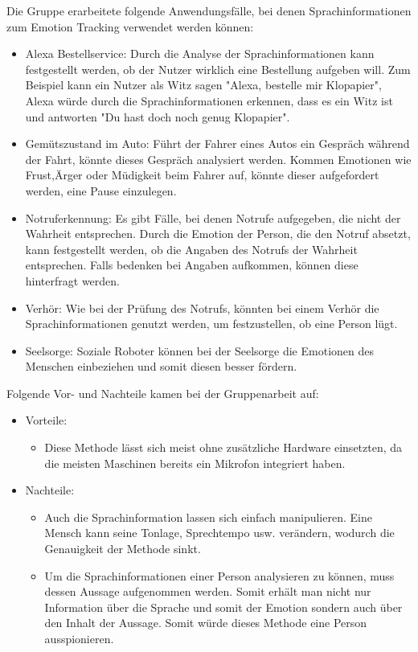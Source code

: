 Die Gruppe erarbeitete folgende Anwendungsfälle, bei denen Sprachinformationen zum Emotion Tracking verwendet werden können:
\begin{itemize}
	\item Alexa Bestellservice: Durch die Analyse der Sprachinformationen kann festgestellt werden, ob der Nutzer wirklich eine Bestellung aufgeben will. Zum Beispiel kann ein Nutzer als Witz sagen "Alexa, bestelle mir Klopapier", Alexa würde durch die Sprachinformationen erkennen, dass es ein Witz ist und antworten "Du hast doch noch genug Klopapier".
	\item Gemütszustand im Auto: Führt der Fahrer eines Autos ein Gespräch während der Fahrt, könnte dieses Gespräch analysiert werden. Kommen Emotionen wie Frust,Ärger oder Müdigkeit beim Fahrer auf, könnte dieser aufgefordert werden, eine Pause einzulegen.
	\item Notruferkennung: Es gibt Fälle, bei denen Notrufe aufgegeben, die nicht der Wahrheit entsprechen. Durch die Emotion der Person, die den Notruf absetzt, kann festgestellt werden, ob die Angaben des Notrufs der Wahrheit entsprechen. Falls bedenken bei Angaben aufkommen, können diese hinterfragt werden.
	\item  Verhör: Wie bei der Prüfung des Notrufs, könnten bei einem Verhör die Sprachinformationen genutzt werden, um festzustellen, ob eine Person lügt.
	\item Seelsorge: Soziale Roboter können bei der Seelsorge die Emotionen des Menschen einbeziehen und somit diesen besser fördern.
\end{itemize}
Folgende Vor- und Nachteile kamen bei der Gruppenarbeit auf:
\begin{itemize}
	\item Vorteile:
	\begin{itemize}
		\item Diese Methode lässt sich meist ohne zusätzliche Hardware einsetzten, da die meisten Maschinen bereits ein Mikrofon integriert haben.		 
	\end{itemize}
	\item Nachteile:
	\begin{itemize}
		\item Auch die Sprachinformation lassen sich einfach manipulieren. Eine Mensch kann seine Tonlage, Sprechtempo usw. verändern, wodurch die Genauigkeit der Methode sinkt.
		\item Um die Sprachinformationen einer Person analysieren zu können, muss dessen Aussage aufgenommen werden. Somit erhält man nicht nur Information über die Sprache und somit der Emotion sondern auch über den Inhalt der Aussage. Somit würde dieses Methode eine Person ausspionieren.
	\end{itemize}
\end{itemize}

